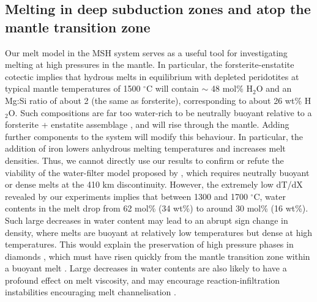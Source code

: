 \documentclass[review]{elsarticle}
\begin{document}
\subsection{Melting in deep subduction zones and atop the mantle transition zone}
Our melt model in the MSH system serves as a useful tool for investigating melting at high pressures in the mantle. In particular, the forsterite-enstatite cotectic implies that hydrous melts in equilibrium with depleted peridotites at typical mantle temperatures of 1500 $^{\circ}$C will contain $\sim$ 48 mol\% H$_2$O and an Mg:Si ratio of about 2 (the same as forsterite), corresponding to about 26 wt\% H$_2$O. Such compositions are far too water-rich to be neutrally buoyant relative to a forsterite + enstatite assemblage \citep{MSK2008}, and will rise through the mantle. Adding further components to the system will modify this behaviour. In particular, the addition of iron lowers anhydrous melting temperatures and increases melt densities. Thus, we cannot directly use our results to confirm or refute the viability of the water-filter model proposed by \cite{BK2003}, which requires neutrally buoyant or dense melts at the 410 km discontinuity. However, the extremely low dT/dX revealed by our experiments implies that between 1300 and 1700 $^{\circ}$C, water contents in the melt drop from 62 mol\% (34 wt\%) to around 30 mol\% (16 wt\%). Such large decreases in water content may lead to an abrupt sign change in density, where melts are buoyant at relatively low temperatures but dense at high temperatures. This would explain the preservation of high pressure phases in diamonds \citep{Pearsonetal2014}, which must have risen quickly from the mantle transition zone within a buoyant melt \citep{Keppler2014}. Large decreases in water contents are also likely to have a profound effect on melt viscosity, and may encourage reaction-infiltration instabilities encouraging melt channelisation \citep{SKA2001}.



\end{document}
